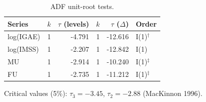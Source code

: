 \begin{table}[ht]
\centering
\begin{threeparttable}
\caption{ADF unit-root tests.} 
\label{tab:adf_coint}
\begin{tabular}{lrrrrl}
  \toprule
Series & $k$ & $\tau$ (levels) & $k$ & $\tau$ ($\Delta$) & Order \\ 
  \midrule
log(IGAE) & 1 & -4.791 & 1 & -12.616 & I(1)$^\dag$ \\ 
  log(IMSS) & 1 & -2.207 & 1 & -12.842 & I(1) \\ 
  MU & 1 & -2.914 & 1 & -10.240 & I(1)$^\ddag$ \\ 
  FU & 1 & -2.735 & 1 & -11.212 & I(1)$^\ddag$ \\ 
   \bottomrule
\end{tabular}
\begin{tablenotes}
\small 
\item  Critical values (5\%): $\tau_3=-3.45$, $\tau_2=-2.88$ (MacKinnon 1996).
\end{tablenotes}
\end{threeparttable}
\end{table}
